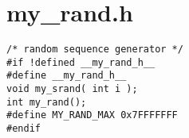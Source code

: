 \section{my\_rand.h}
\begin{verbatim}
/* random sequence generator */
#if !defined __my_rand_h__
#define __my_rand_h__
void my_srand( int i );
int my_rand();
#define MY_RAND_MAX 0x7FFFFFFF
#endif
\end{verbatim}
